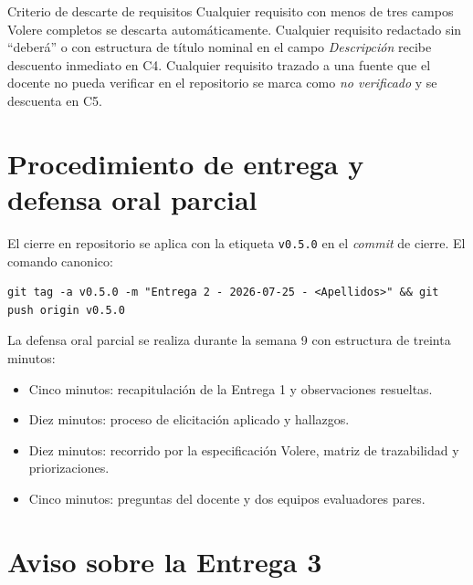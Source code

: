 \documentclass[11pt,a4paper]{article}
\begin{document}
\begin{cajacritica}{Criterio de descarte de requisitos}
Cualquier requisito con menos de tres campos Volere completos se descarta autom\'aticamente. Cualquier requisito redactado sin ``deber\'a'' o con estructura de t\'itulo nominal en el campo \emph{Descripci\'on} recibe descuento inmediato en C4. Cualquier requisito trazado a una fuente que el docente no pueda verificar en el repositorio se marca como \emph{no verificado} y se descuenta en C5.
\end{cajacritica}

\section{Procedimiento de entrega y defensa oral parcial}

El cierre en repositorio se aplica con la etiqueta \texttt{v0.5.0} en el \emph{commit} de cierre. El comando canonico:

\begin{lstlisting}
git tag -a v0.5.0 -m "Entrega 2 - 2026-07-25 - <Apellidos>" && git push origin v0.5.0
\end{lstlisting}

La defensa oral parcial se realiza durante la semana 9 con estructura de treinta minutos:

\begin{itemize}
    \item Cinco minutos: recapitulaci\'on de la Entrega 1 y observaciones resueltas.
    \item Diez minutos: proceso de elicitaci\'on aplicado y hallazgos.
    \item Diez minutos: recorrido por la especificaci\'on Volere, matriz de trazabilidad y priorizaciones.
    \item Cinco minutos: preguntas del docente y dos equipos evaluadores pares.
\end{itemize}

\section{Aviso sobre la Entrega 3}
\end{document}
